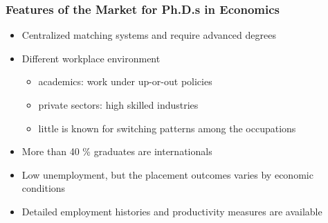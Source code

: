 \documentclass[11pt]{beamer}
\begin{document}
\begin{frame}
	\frametitle{Features of the Market for Ph.D.s in Economics}
	\begin{itemize}
		
							    \item Centralized matching systems and require advanced degrees
							    \vspace{1mm}
							    \item Different workplace environment
							    \begin{itemize}
							    	\item academics: work under up-or-out policies%
							    	\item private sectors:  high skilled industries
							 	    \item little is known for switching patterns among the occupations   
						     \end{itemize}
					     \vspace{1mm}
					     		\item More than 40 \% graduates are internationals
			   				    \vspace{1mm}
			   				    \item Low unemployment, but the placement outcomes varies by economic conditions
			   				   \vspace{1mm}
			   				    \item Detailed employment histories and productivity measures are available
		
	\end{itemize}
\end{frame}
\end{document}
